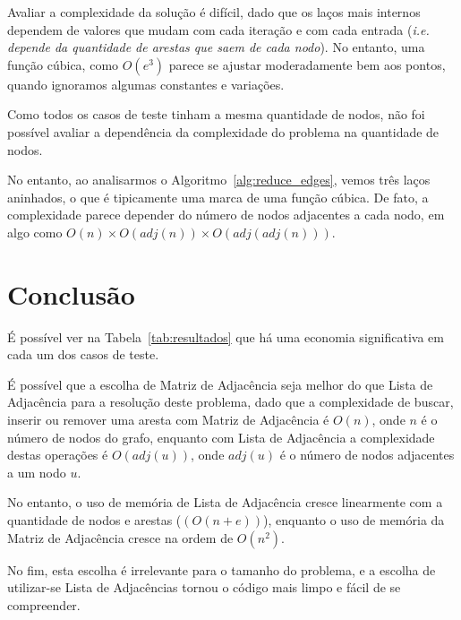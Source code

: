 \documentclass[12pt]{article}
\begin{document}
Avaliar a complexidade da solução é difícil, dado que os laços mais internos
dependem de valores que mudam com cada iteração e com cada entrada (\textit{i.e.
depende da quantidade de arestas que saem de cada nodo}). No entanto, uma função
cúbica, como $O(e^3)$ parece se ajustar moderadamente bem aos pontos, quando
ignoramos algumas constantes e variações.

Como todos os casos de teste tinham a mesma quantidade de nodos, não foi
possível avaliar a dependência da complexidade do problema na quantidade de nodos.

No entanto, ao analisarmos o Algoritmo~\ref{alg:reduce_edges}, vemos três laços
aninhados, o que é tipicamente uma marca de uma função cúbica. De fato, a
complexidade parece depender do número de nodos adjacentes a cada nodo, em algo
como $O(n) \times O(adj(n)) \times O(adj(adj(n)))$.

\section{Conclusão}\label{sec:conclusao}

É possível ver na Tabela~\ref{tab:resultados} que há uma economia significativa
em cada um dos casos de teste.

É possível que a escolha de Matriz de Adjacência seja melhor do que Lista de
Adjacência para a resolução deste problema, dado que a complexidade de buscar,
inserir ou remover uma aresta com Matriz de Adjacência é $O(n)$, onde $n$ é o
número de nodos do grafo, enquanto com Lista de Adjacência a complexidade destas
operações é $O(adj(u))$, onde $adj(u)$ é o número de nodos adjacentes a um nodo $u$.

No entanto, o uso de memória de Lista de Adjacência cresce linearmente com a
quantidade de nodos e arestas ($(O(n + e))$), enquanto o uso de memória da
Matriz de Adjacência cresce na ordem de $O(n^2)$.

No fim, esta escolha é irrelevante para o tamanho do problema, e a escolha de
utilizar-se Lista de Adjacências tornou o código mais limpo e fácil de se compreender.
\end{document}
